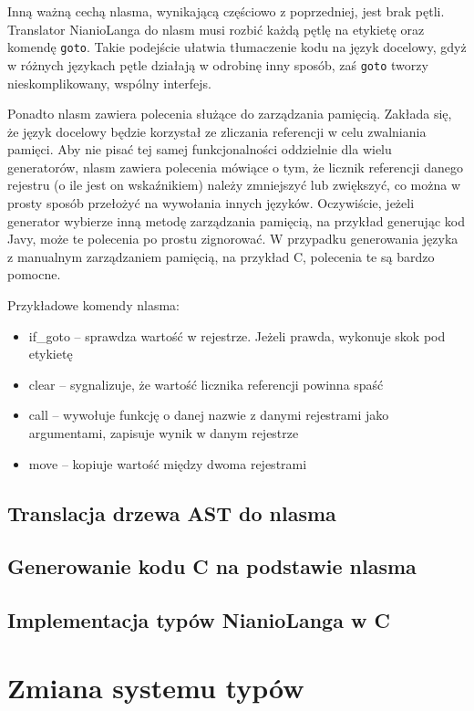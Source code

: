 \documentclass[licencjacka]{pracamgr}
\begin{document}
Inną ważną cechą nlasma, wynikającą częściowo z poprzedniej, jest brak pętli. Translator NianioLanga do nlasm musi rozbić każdą pętlę na etykietę oraz komendę \texttt{goto}. Takie podejście ułatwia tłumaczenie kodu na język docelowy, gdyż w różnych językach pętle działają w odrobinę inny sposób, zaś \texttt{goto} tworzy nieskomplikowany, wspólny interfejs.

Ponadto nlasm zawiera polecenia służące do zarządzania pamięcią. Zakłada się, że język docelowy będzie korzystał ze zliczania referencji w celu zwalniania pamięci. Aby nie pisać tej samej funkcjonalności oddzielnie dla wielu generatorów, nlasm zawiera polecenia mówiące o tym, że licznik referencji danego rejestru (o ile jest on wskaźnikiem) należy zmniejszyć lub zwiększyć, co można w prosty sposób przełożyć na wywołania innych języków. Oczywiście, jeżeli generator wybierze inną metodę zarządzania pamięcią, na przykład generując kod Javy, może te polecenia po prostu zignorować. W przypadku generowania języka z manualnym zarządzaniem pamięcią, na przykład C, polecenia te są bardzo pomocne.


Przykładowe komendy nlasma:
\begin{itemize}
\item if\_goto -- sprawdza wartość w rejestrze. Jeżeli prawda, wykonuje skok pod etykietę
\item clear -- sygnalizuje, że wartość licznika referencji powinna spaść
\item call -- wywołuje funkcję o danej nazwie z danymi rejestrami jako argumentami, zapisuje wynik w danym rejestrze
\item move -- kopiuje wartość między dwoma rejestrami
\end{itemize}
\section{Translacja drzewa AST do nlasma}
\section{Generowanie kodu C na podstawie nlasma}
\section{Implementacja typów NianioLanga w C}

\chapter{Zmiana systemu typów}
\end{document}
